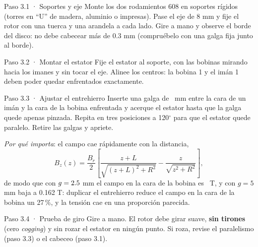 \documentclass[11pt]{article}
\begin{document}
\begin{paso}{Paso 3.1 · Soportes y eje}
Monte los dos rodamientos 608 en soportes rígidos (torres en ``U'' de madera, aluminio o impresas). Pase el eje
de 8 mm y fije el rotor con una tuerca y una arandela a cada lado. Gire a mano y observe el borde del disco:
no debe cabecear más de 0.3 mm (compruébelo con una galga fija junto al borde).
\end{paso}

\begin{paso}{Paso 3.2 · Montar el estator}
Fije el estator al soporte, con las bobinas mirando hacia los imanes y sin tocar el eje. Alinee los centros:
la bobina 1 y el imán 1 deben poder quedar enfrentados exactamente.
\end{paso}

\begin{paso}{Paso 3.3 · Ajustar el entrehierro}
Inserte una galga de \ValEntrehierro\ mm entre la cara de un imán y la cara de la bobina enfrentada y acerque
el estator hasta que la galga quede apenas pinzada. Repita en tres posiciones a 120$^\circ$ para que el estator
quede paralelo. Retire las galgas y apriete.

\emph{Por qué importa}: el campo cae rápidamente con la distancia,
\[
B_z(z)=\frac{B_r}{2}\left[\frac{z+L}{\sqrt{(z+L)^2+R^2}}-\frac{z}{\sqrt{z^2+R^2}}\right],
\]
de modo que con $g=2.5$ mm el campo en la cara de la bobina es \ValCampoCaraBobina\ T, y con
$g=5$ mm baja a 0.162 T: duplicar el entrehierro reduce el campo en la cara de la bobina un 27\,\%, y la
tensión cae en una proporción parecida.
\end{paso}

\begin{paso}{Paso 3.4 · Prueba de giro}
Gire a mano. El rotor debe girar suave, \textbf{sin tirones} (cero \emph{cogging}) y sin rozar el estator en
ningún punto. Si roza, revise el paralelismo (paso 3.3) o el cabeceo (paso 3.1).
\end{paso}

\end{document}
